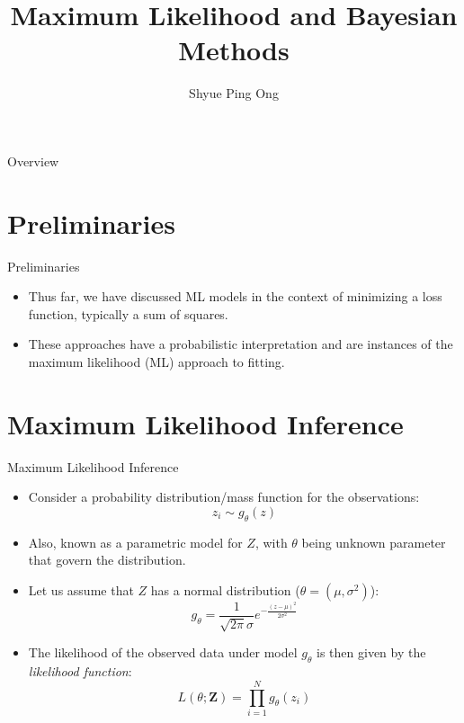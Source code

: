 \documentclass[aspectratio=169]{beamer}
\title[Maximum Likelihood and Bayesian Methods]{Maximum Likelihood and Bayesian Methods}
\author{Shyue Ping Ong}
\institute[UCSD]{University of California, San Diego\\
\medskip
}
\date{\classyear} %
\let \vec \mathbf
\begin{document}
\begin{frame}
    \titlepage %
\end{frame}


\begin{frame}{Overview}
    \tableofcontents
\end{frame}


\section{Preliminaries}

\begin{frame}{Preliminaries}
    \begin{itemize}
        \item Thus far, we have discussed ML models in the context of minimizing a loss function, typically a sum of squares.
        \item These approaches have a probabilistic interpretation and are instances of the maximum likelihood (ML) approach to fitting.
    \end{itemize}
\end{frame}

\section{Maximum Likelihood Inference}


\begin{frame}{Maximum Likelihood Inference}
    \begin{itemize}
        \item Consider a probability distribution/mass function for the observations:
        \begin{equation*}
            z_i \sim g_{\theta}(z)
        \end{equation*}
        \item Also, known as a parametric model for $Z$, with $\theta$ being unknown parameter that govern the distribution. 
        \item Let us assume that $Z$ has a normal distribution ($\theta = (\mu, \sigma^2)$):
        \begin{equation*}
            g_{\theta} = \frac{1}{\sqrt{2\pi}\sigma} e^{-\frac{(z-\mu)^2}{2\sigma^2}}
        \end{equation*}
        \item The likelihood of the observed data under model $g_{\theta}$ is then given by the \textit{likelihood function}:
        \begin{equation*}
            L(\theta; \vec{Z}) = \prod_{i=1}^N g_{\theta}(z_i)
        \end{equation*}
    \end{itemize}
\end{frame} 
\end{document}
